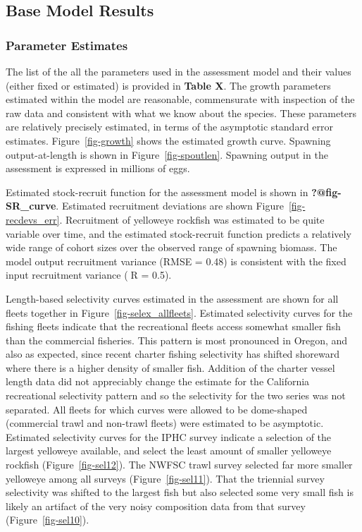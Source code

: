 \documentclass[
]{scrartcl}
\begin{document}
\subsection{Base Model Results}\label{base-model-results}

\subsubsection{Parameter Estimates}\label{parameter-estimates}

The list of the all the parameters used in the assessment model and
their values (either fixed or estimated) is provided in \textbf{Table
X}. The growth parameters estimated within the model are reasonable,
commensurate with inspection of the raw data and consistent with what we
know about the species. These parameters are relatively precisely
estimated, in terms of the asymptotic standard error estimates.
Figure~\ref{fig-growth} shows the estimated growth curve. Spawning
output-at-length is shown in Figure~\ref{fig-spoutlen}. Spawning output
in the assessment is expressed in millions of eggs.

Estimated stock-recruit function for the assessment model is shown in
\textbf{?@fig-SR\_curve}. Estimated recruitment deviations are shown
Figure~\ref{fig-recdevs_err}. Recruitment of yelloweye rockfish was
estimated to be quite variable over time, and the estimated
stock-recruit function predicts a relatively wide range of cohort sizes
over the observed range of spawning biomass. The model output
recruitment variance (RMSE = 0.48) is consistent with the fixed input
recruitment variance (R = 0.5).

Length-based selectivity curves estimated in the assessment are shown
for all fleets together in Figure~\ref{fig-selex_allfleets}. Estimated
selectivity curves for the fishing fleets indicate that the recreational
fleets access somewhat smaller fish than the commercial fisheries. This
pattern is most pronounced in Oregon, and also as expected, since recent
charter fishing selectivity has shifted shoreward where there is a
higher density of smaller fish. Addition of the charter vessel length
data did not appreciably change the estimate for the California
recreational selectivity pattern and so the selectivity for the two
series was not separated. All fleets for which curves were allowed to be
dome-shaped (commercial trawl and non-trawl fleets) were estimated to be
asymptotic. Estimated selectivity curves for the IPHC survey indicate a
selection of the largest yelloweye available, and select the least
amount of smaller yelloweye rockfish (Figure~\ref{fig-sel12}). The NWFSC
trawl survey selected far more smaller yelloweye among all surveys
(Figure~\ref{fig-sel11}). That the triennial survey selectivity was
shifted to the largest fish but also selected some very small fish is
likely an artifact of the very noisy composition data from that survey
(Figure~\ref{fig-sel10}).
\end{document}
